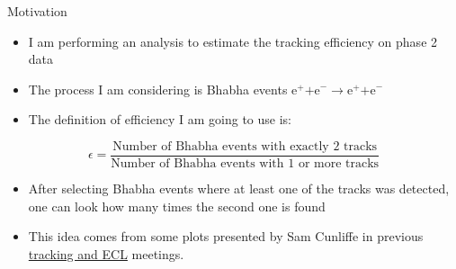 \documentclass[8pt]{beamer}
\begin{document}
\begin{frame}{Motivation}

\begin{itemize}	
	\item I am performing an analysis to estimate the tracking efficiency on phase 2 data
	\item The process I am considering is Bhabha events $\textrm{e}^+ \textrm{+e}^- \rightarrow \textrm{e}^+ \textrm{+e}^- $ 
	\item The definition of efficiency I am going to use is:

\end{itemize}
	\begin{equation*}
		\epsilon = \frac{\textrm{Number of Bhabha events with exactly 2 tracks}}{\textrm{Number of Bhabha events with 1 or more tracks}}
	\end{equation*}
	
	\begin{itemize}
		\item After selecting Bhabha events where at least one of the tracks was detected, one can look how many times the second one is found
		\item  This idea comes from some plots presented by Sam Cunliffe in previous  \href{https://confluence.desy.de/display/BI/ECL+Meetings?preview=/84320165/109161400/SCunliffe181123-ECL.pdf}{tracking and ECL} meetings.
	\end{itemize}





\end{frame}
	
\end{document}
